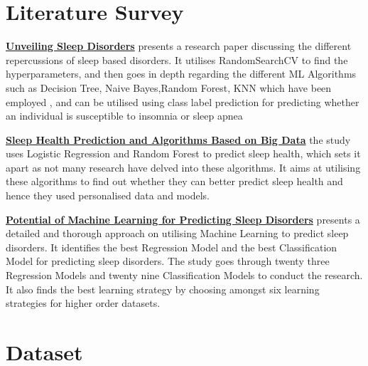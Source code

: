 \documentclass[10pt,twocolumn,letterpaper]{article}
\begin{document}
\section{Literature Survey}
\textbf{\href{https://ieeexplore.ieee.org/stamp/stamp.jsp?tp=&arnumber=10468035}{Unveiling Sleep Disorders}} presents a research paper discussing the different repercussions of sleep based disorders. It utilises RandomSearchCV to find the hyperparameters, and then goes in depth regarding the different ML Algorithms such as Decision Tree, Naive Bayes,Random Forest, KNN which have been employed , and can be utilised using class label prediction for predicting whether an individual is susceptible to insomnia or sleep apnea

\textbf{\href{https://www.atlantis-press.com/article/125998057.pdf}{Sleep Health Prediction and Algorithms Based on Big Data}} the study uses Logistic Regression and Random Forest to predict sleep health, which sets it apart as not many research have delved into these algorithms. It aims at utilising these algorithms to find out whether they can better predict sleep health and hence they used personalised data and models.

\textbf{\href{https://www.mdpi.com/2075-4418/14/1/27}{Potential of Machine Learning for Predicting Sleep Disorders}} presents a detailed and thorough approach on utilising Machine Learning to predict sleep disorders. It identifies the best Regression Model and the best Classification Model for predicting sleep disorders. The study goes through twenty three Regression Models and twenty nine Classification Models to conduct the research. It also finds the best learning strategy by choosing amongst six learning strategies for higher order datasets.

\section{Dataset}
\end{document}
